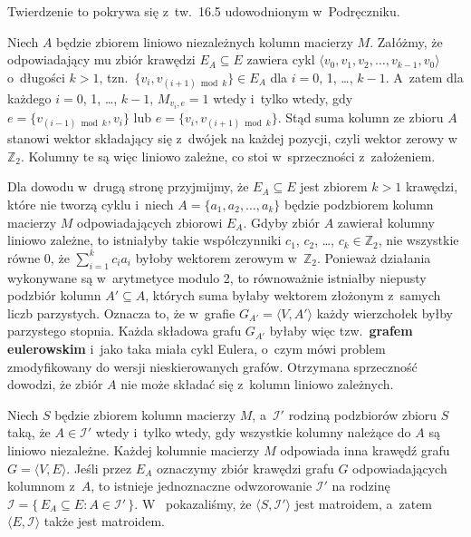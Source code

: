 
\subproblem %
Twierdzenie to pokrywa się z~tw.\ 16.5 udowodnionym w~Podręczniku.

\subproblem %

\noindent Niech $A$ będzie zbiorem liniowo niezależnych kolumn macierzy $M$.
Załóżmy, że odpowiadający mu zbiór krawędzi $E_A\subseteq E$ zawiera cykl $\langle v_0,v_1,v_2,\dots,v_{k-1},v_0\rangle$ o~długości $k>1$, tzn.\ $\{v_i,v_{(i+1)\bmod k}\}\in E_A$ dla $i=0$, 1, \dots, $k-1$.
A~zatem dla każdego $i=0$, 1, \dots, $k-1$, $M_{v_i,e}=1$ wtedy i~tylko wtedy, gdy $e=\bigl\{v_{(i-1)\bmod k},v_i\bigr\}$ lub $e=\bigl\{v_i,v_{(i+1)\bmod k}\bigr\}$.
Stąd suma kolumn ze zbioru $A$ stanowi wektor składający się z~dwójek na każdej pozycji, czyli wektor zerowy w~$\mathbb{Z}_2$.
Kolumny te są więc liniowo zależne, co stoi w~sprzeczności z~założeniem.

Dla dowodu w~drugą stronę przyjmijmy, że $E_A\subseteq E$ jest zbiorem $k>1$ krawędzi, które nie tworzą cyklu i~niech $A=\{a_1,a_2,\dots,a_k\}$ będzie podzbiorem kolumn macierzy $M$ odpowiadających zbiorowi $E_A$.
Gdyby zbiór $A$ zawierał kolumny liniowo zależne, to istniałyby takie współczynniki $c_1$, $c_2$, \dots, $c_k\in\mathbb{Z}_2$, nie wszystkie równe 0, że $\sum_{i=1}^kc_ia_i$ byłoby wektorem zerowym w~$\mathbb{Z}_2$.
Ponieważ działania wykonywane są w~arytmetyce modulo 2, to równoważnie istniałby niepusty podzbiór kolumn $A'\subseteq A$, których suma byłaby wektorem złożonym z~samych liczb parzystych.
Oznacza to, że w~grafie $G_{A'}=\langle V,A'\rangle$ każdy wierzchołek byłby parzystego stopnia.
Każda składowa grafu $G_{A'}$ byłaby więc tzw.\ \textbf{grafem eulerowskim} i~jako taka miała cykl Eulera, o~czym mówi problem  zmodyfikowany do wersji nieskierowanych grafów.
Otrzymana sprzeczność dowodzi, że zbiór $A$ nie może składać się z~kolumn liniowo zależnych.

Niech $S$ będzie zbiorem kolumn macierzy $M$, a~$\mathcal{I}'$ rodziną podzbiorów zbioru $S$ taką, że $A\in\mathcal{I}'$ wtedy i~tylko wtedy, gdy wszystkie kolumny należące do $A$ są liniowo niezależne.
Każdej kolumnie macierzy $M$ odpowiada inna krawędź grafu $G=\langle V,E\rangle$.
Jeśli przez $E_A$ oznaczymy zbiór krawędzi grafu $G$ odpowiadających kolumnom z~$A$, to istnieje jednoznaczne odwzorowanie $\mathcal{I}'$ na rodzinę $\mathcal{I}=\{\,E_A\subseteq E:A\in\mathcal{I}'\,\}$.
W~ pokazaliśmy, że $\langle S,\mathcal{I}'\rangle$ jest matroidem, a~zatem $\langle E,\mathcal{I}\rangle$ także jest matroidem.

